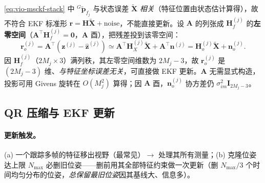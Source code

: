 \begin{theorem}\label{thm:vio-nullproj}
\cref{eq:vio-msckf-stack} 中 ${}^G\tilde{\mathbf{p}}_{f_j}$ 与状态误差 $\tilde{\mathbf{X}}$ \emph{相关}（特征位置由状态估计算得），故不符合 EKF 标准形 $\mathbf{r}=\mathbf{H}\tilde{\mathbf{X}}+\text{noise}$，不能直接更新。设 $\mathbf{A}$ 的列张成 $\mathbf{H}_f^{(j)}$ 的\textbf{左零空间}（$\mathbf{A}^\top\mathbf{H}_f^{(j)}=\mathbf{0}$，$\mathbf{A}$ 酉），把残差投到该零空间\cite{mourikis2007msckf}：
\begin{equation}
  \mathbf{r}_o^{(j)}=\mathbf{A}^\top(\mathbf{z}^{(j)}-\hat{\mathbf{z}}^{(j)})\simeq\mathbf{A}^\top\mathbf{H}_X^{(j)}\tilde{\mathbf{X}}+\mathbf{A}^\top\mathbf{n}^{(j)}=\mathbf{H}_o^{(j)}\tilde{\mathbf{X}}+\mathbf{n}_o^{(j)}.
  \label{eq:vio-nullproj}
\end{equation}
因 $\mathbf{H}_f^{(j)}$（$2M_j\times3$）满列秩，其左零空间维数为 $2M_j-3$，故 $\mathbf{r}_o^{(j)}$ 是 $(2M_j-3)$ 维、\emph{与特征坐标误差无关}，可直接做 EKF 更新。$\mathbf{A}$ 无需显式构造，投影可用 Givens 旋转在 $O(M_j^2)$ 算得；因 $\mathbf{A}$ 酉，$\mathbf{n}_o^{(j)}$ 协方差仍 $\sigma_{im}^2\mathbf{I}_{2M_j-3}$。
\end{theorem}

\subsection{QR 压缩与 EKF 更新}
\label{sec:vio-msckf-update}

\paragraph{更新触发。}
(a) 一个跟踪多帧的特征移出视野（最常见）$\to$ 处理其所有测量；(b) 克隆位姿达上限 $N_{\max}$ 必删旧位姿——删前用其全部特征约束做一次更新（删 $N_{\max}/3$ 个时间均匀分布的位姿，\emph{总保留最旧位姿}因其基线大、信息多）。

